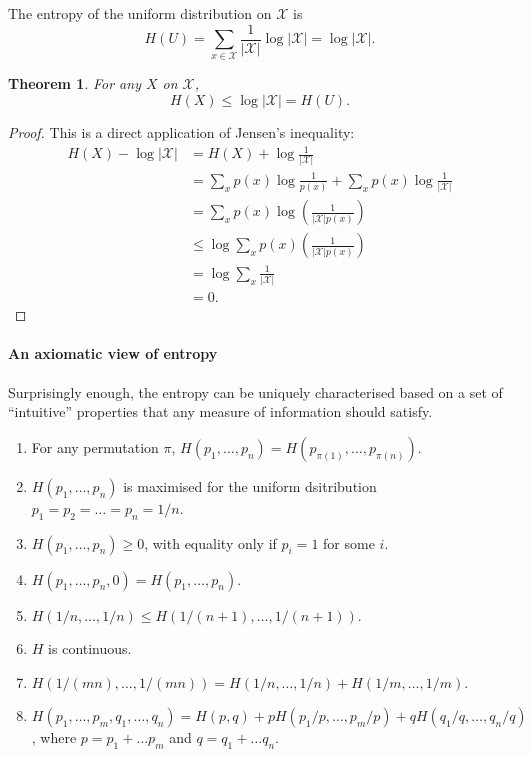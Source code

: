 \documentclass[a4paper, 11pt, openany]{book}
\numberwithin{equation}{section}
\theoremstyle{plain}
\newtheorem{theorem}	[equation]	{Theorem}
\theoremstyle{definition}
\newcommand{\alphabet}[1]{\mathcal{#1}}
\begin{document}
The entropy of the uniform distribution on $\alphabet{X}$ is
\[
	H(U) = \sum_{x \in \alphabet{X}} \frac{1}{|\alphabet{X}|} \log |\alphabet{X}| =  \log |\alphabet{X}|.
\]

\begin{theorem}
For any $X$ on $\alphabet{X}$, 
\[
	H(X) \le  \log |\alphabet{X}| = H(U).
\]
\end{theorem}

\begin{proof}
This is a direct application of Jensen's inequality:
\begin{align*}
    H(X) - \log|\alphabet{X}| &= H(X) + \log \frac{1}{|\alphabet{X}|}\\
    &= \sum_x p(x) \log \frac{1}{p(x)} + \sum_x p(x) \log \frac{1}{|\alphabet{X}|}\\
    &= \sum_x p(x) \log \left( \frac{1} {|\alphabet{X}| p(x)} \right)\\
    &\le \log \sum_x p(x) \left( \frac{1} {|\alphabet{X}| p(x)} \right)\\
    &= \log \sum_x \frac{1}{|\alphabet{X}|}\\
    &= 0.
\end{align*}
\end{proof}

\paragraph{An axiomatic view of entropy}

Surprisingly enough, the entropy can be uniquely characterised based on a set of ``intuitive'' properties that any measure of information should satisfy.
\begin{enumerate}
    \item For any permutation $\pi$, $H(p_1, \dots, p_n) = H(p_{\pi(1)}, \dots, p_{\pi(n)})$.
    
    \item $H(p_1, \dots, p_n)$ is maximised for the uniform dsitribution $p_1 = p_2 = \dots = p_n = 1/n$.
    
    \item $H(p_1, \dots, p_n) \ge 0$, with equality only if $p_i = 1$ for some $i$.
    
    \item $H(p_1, \dots, p_n, 0) = H(p_1, \dots, p_n)$.
    
    \item $H(1/n, \dots, 1/n) \le H(1/(n+1), \dots, 1/(n+1))$.
    
    \item $H$ is continuous.
    
    \item $H(1/(mn), \dots, 1/(mn)) = H(1/n, \dots, 1/n) + H(1/m, \dots, 1/m)$.
    
    \item $H(p_1, \dots, p_m, q_1, \dots, q_n) = H(p,q) + p H(p_1/p, \dots, p_m/p) + q H( q_1/q, \dots, q_n/q )$, where $p = p_1 + \dots p_m$ and $q = q_1 + \dots q_n$.
\end{enumerate}
\end{document}
